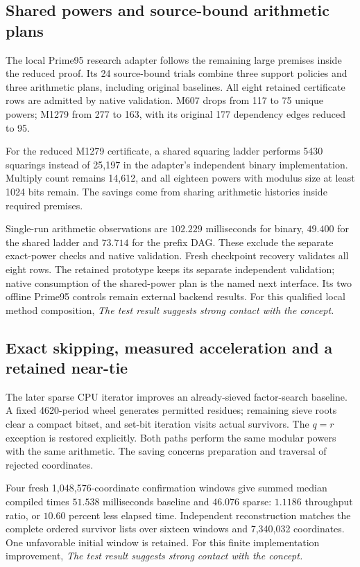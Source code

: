 \subsection{Shared powers and source-bound arithmetic plans}

The local Prime95 research adapter follows the remaining
large premises inside the reduced proof. Its 24 source-bound
trials combine three support policies and three arithmetic
plans, including original baselines. All eight retained
certificate rows are admitted by native validation.
M607 drops from 117 to 75 unique powers; M1279 from
277 to 163, with its original 177 dependency edges
reduced to 95.

For the reduced M1279 certificate, a shared squaring
ladder performs 5430 squarings instead of 25,197 in
the adapter's independent binary implementation.
Multiply count remains 14,612, and all eighteen powers
with modulus size at least 1024 bits remain.
The savings come from sharing arithmetic histories
inside required premises.

Single-run arithmetic observations are \(102.229\)
milliseconds for binary, \(49.400\) for the shared
ladder and \(73.714\) for the prefix DAG. These exclude
the separate exact-power checks and native validation.
Fresh checkpoint recovery validates all eight rows.
The retained prototype keeps its separate independent
validation; native consumption of the shared-power
plan is the named next interface. Its two offline
Prime95 controls remain external backend results.
For this qualified local method composition,
\emph{The test result suggests strong contact with the
concept.}

\subsection{Exact skipping, measured acceleration and a retained near-tie}

The later sparse CPU iterator improves an already-sieved
factor-search baseline. A fixed 4620-period wheel generates
permitted residues; remaining sieve roots clear a compact
bitset, and set-bit iteration visits actual survivors.
The \(q=r\) exception is restored explicitly. Both paths
perform the same modular powers with the same arithmetic.
The saving concerns preparation and traversal of rejected
coordinates.

Four fresh 1,048,576-coordinate confirmation windows give
summed median compiled times \(51.538\) milliseconds
baseline and \(46.076\) sparse: \(1.1186\) throughput
ratio, or \(10.60\) percent less elapsed time.
Independent reconstruction matches the complete ordered
survivor lists over sixteen windows and 7,340,032
coordinates. One unfavorable initial window is retained.
For this finite implementation improvement,
\emph{The test result suggests strong contact with the
concept.}

